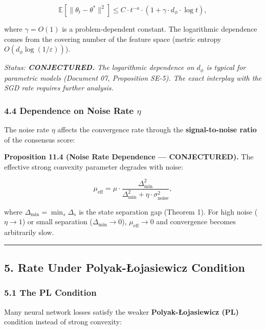 \documentclass[
  12pt,
]{article}
\begin{document}
\[\mathbb{E}[\|\theta_t - \theta^*\|^2] \leq C \cdot t^{-a} \cdot (1 + \gamma \cdot d_\phi \cdot \log t),\]

where \(\gamma = O(1)\) is a problem-dependent constant. The logarithmic
dependence comes from the covering number of the feature space (metric
entropy \(O(d_\phi \log(1/\varepsilon))\)).

\emph{Status: \textbf{CONJECTURED.} The logarithmic dependence on
\(d_\phi\) is typical for parametric models (Document 07, Proposition
SE-5). The exact interplay with the SGD rate requires further analysis.}

\subsubsection{\texorpdfstring{4.4 Dependence on Noise Rate
\(\eta\)}{4.4 Dependence on Noise Rate \textbackslash eta}}\label{dependence-on-noise-rate-eta}

The noise rate \(\eta\) affects the convergence rate through the
\textbf{signal-to-noise ratio} of the consensus score:

\textbf{Proposition 11.4 (Noise Rate Dependence --- CONJECTURED).} The
effective strong convexity parameter degrades with noise:

\[\mu_{\text{eff}} = \mu \cdot \frac{\Delta_{\min}^2}{\Delta_{\min}^2 + \eta \cdot \sigma_{\text{noise}}^2},\]

where \(\Delta_{\min} = \min_s \Delta_s\) is the state separation gap
(Theorem 1). For high noise (\(\eta \to 1\)) or small separation
(\(\Delta_{\min} \to 0\)), \(\mu_{\text{eff}} \to 0\) and convergence
becomes arbitrarily slow.

\begin{center}\rule{0.5\linewidth}{0.5pt}\end{center}

\subsection{5. Rate Under Polyak-Łojasiewicz
Condition}\label{rate-under-polyak-ux142ojasiewicz-condition}

\subsubsection{5.1 The PL Condition}\label{the-pl-condition}

Many neural network losses satisfy the weaker \textbf{Polyak-Łojasiewicz
(PL)} condition instead of strong convexity:
\end{document}
